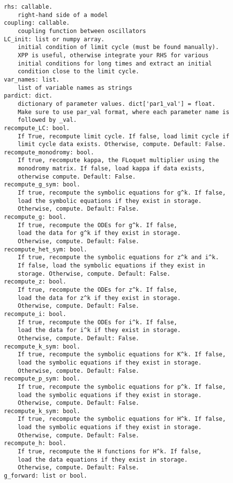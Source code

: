 \documentclass[english,a4paper,oneside]{article}
\begin{document}
\begin{verbatim}
rhs: callable.
    right-hand side of a model
coupling: callable.
    coupling function between oscillators
LC_init: list or numpy array.
    initial condition of limit cycle (must be found manually).
    XPP is useful, otherwise integrate your RHS for various
    initial conditions for long times and extract an initial
    condition close to the limit cycle.
var_names: list.
    list of variable names as strings
pardict: dict.
    dictionary of parameter values. dict['par1_val'] = float.
    Make sure to use par_val format, where each parameter name is
    followed by _val.
recompute_LC: bool.
    If True, recompute limit cycle. If false, load limit cycle if
    limit cycle data exists. Otherwise, compute. Default: False.
recompute_monodromy: bool.
    If true, recompute kappa, the FLoquet multiplier using the
    monodromy matrix. If false, load kappa if data exists,
    otherwise compute. Default: False.
recompute_g_sym: bool.
    If true, recompute the symbolic equations for g^k. If false,
    load the symbolic equations if they exist in storage.
    Otherwise, compute. Default: False.
recompute_g: bool.
    If true, recompute the ODEs for g^k. If false,
    load the data for g^k if they exist in storage.
    Otherwise, compute. Default: False.
recompute_het_sym: bool.
    If true, recompute the symbolic equations for z^k and i^k.
    If false, load the symbolic equations if they exist in
    storage. Otherwise, compute. Default: False.
recompute_z: bool.
    If true, recompute the ODEs for z^k. If false,
    load the data for z^k if they exist in storage.
    Otherwise, compute. Default: False.
recompute_i: bool.
    If true, recompute the ODEs for i^k. If false,
    load the data for i^k if they exist in storage.
    Otherwise, compute. Default: False.
recompute_k_sym: bool.
    If true, recompute the symbolic equations for K^k. If false,
    load the symbolic equations if they exist in storage.
    Otherwise, compute. Default: False.
recompute_p_sym: bool.
    If true, recompute the symbolic equations for p^k. If false,
    load the symbolic equations if they exist in storage.
    Otherwise, compute. Default: False.
recompute_k_sym: bool.
    If true, recompute the symbolic equations for H^k. If false,
    load the symbolic equations if they exist in storage.
    Otherwise, compute. Default: False.
recompute_h: bool.
    If true, recompute the H functions for H^k. If false,
    load the data equations if they exist in storage.
    Otherwise, compute. Default: False.
g_forward: list or bool.

\end{verbatim}
\end{document}
